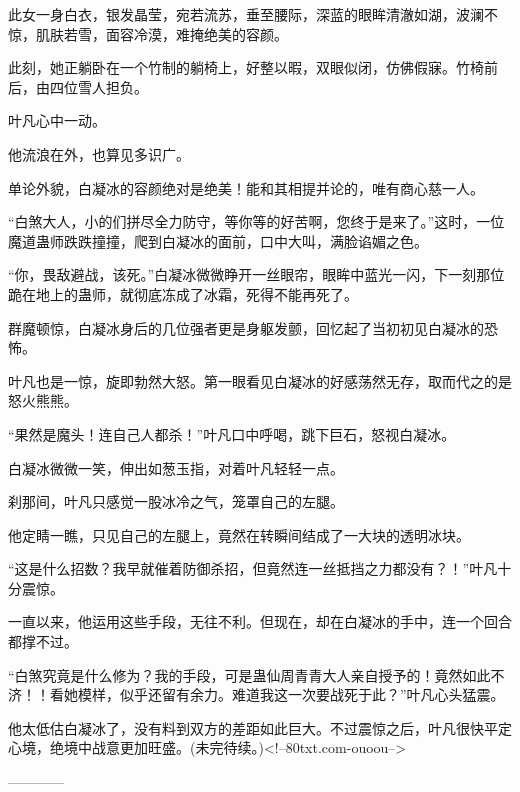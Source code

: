 \begin{this_body}
此女一身白衣，银发晶莹，宛若流苏，垂至腰际，深蓝的眼眸清澈如湖，波澜不惊，肌肤若雪，面容冷漠，难掩绝美的容颜。

此刻，她正躺卧在一个竹制的躺椅上，好整以暇，双眼似闭，仿佛假寐。竹椅前后，由四位雪人担负。

叶凡心中一动。

他流浪在外，也算见多识广。

单论外貌，白凝冰的容颜绝对是绝美！能和其相提并论的，唯有商心慈一人。

“白煞大人，小的们拼尽全力防守，等你等的好苦啊，您终于是来了。”这时，一位魔道蛊师跌跌撞撞，爬到白凝冰的面前，口中大叫，满脸谄媚之色。

“你，畏敌避战，该死。”白凝冰微微睁开一丝眼帘，眼眸中蓝光一闪，下一刻那位跪在地上的蛊师，就彻底冻成了冰霜，死得不能再死了。

群魔顿惊，白凝冰身后的几位强者更是身躯发颤，回忆起了当初初见白凝冰的恐怖。

叶凡也是一惊，旋即勃然大怒。第一眼看见白凝冰的好感荡然无存，取而代之的是怒火熊熊。

“果然是魔头！连自己人都杀！”叶凡口中呼喝，跳下巨石，怒视白凝冰。

白凝冰微微一笑，伸出如葱玉指，对着叶凡轻轻一点。

刹那间，叶凡只感觉一股冰冷之气，笼罩自己的左腿。

他定睛一瞧，只见自己的左腿上，竟然在转瞬间结成了一大块的透明冰块。

“这是什么招数？我早就催着防御杀招，但竟然连一丝抵挡之力都没有？！”叶凡十分震惊。

一直以来，他运用这些手段，无往不利。但现在，却在白凝冰的手中，连一个回合都撑不过。

“白煞究竟是什么修为？我的手段，可是蛊仙周青青大人亲自授予的！竟然如此不济！！看她模样，似乎还留有余力。难道我这一次要战死于此？”叶凡心头猛震。

他太低估白凝冰了，没有料到双方的差距如此巨大。不过震惊之后，叶凡很快平定心境，绝境中战意更加旺盛。(未完待续。)<!--80txt.com-ouoou-->

------------

\end{this_body}

